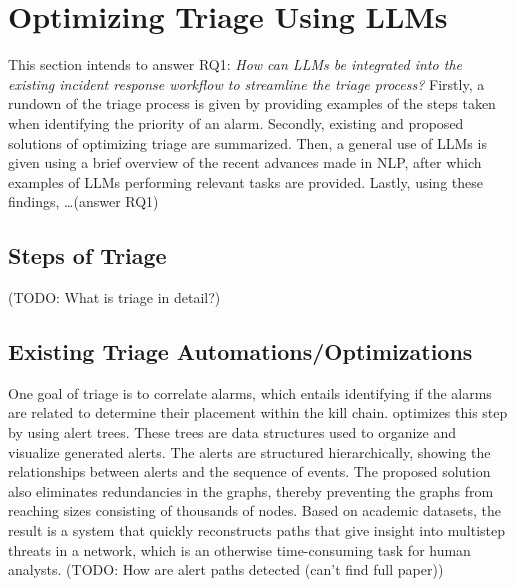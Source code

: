 \section{Optimizing Triage Using LLMs}
\label{sec:rq1}

This section intends to answer RQ1: \textit{How can LLMs be integrated into the existing incident response workflow to
streamline the triage process?}
Firstly, a rundown of the triage process is given by providing examples of the steps taken when identifying the priority
of an alarm.
Secondly, existing and proposed solutions of optimizing triage are summarized.
Then, a general use of LLMs is given using a brief overview of the recent advances made in NLP, after which examples
of LLMs performing relevant tasks are provided.
Lastly, using these findings, \dots (answer RQ1) %

\subsection{Steps of Triage}
\label{subsec:rq1-steps-of-triage}

(TODO: What is triage in detail?) %

\subsection{Existing Triage Automations/Optimizations}
\label{subsec:rq1-existing-optimizations}

One goal of triage is to correlate alarms, which entails identifying if the alarms are related to determine their
placement within the kill chain.
\citet{ficke2022reconstructing} optimizes this step by using alert trees.
These trees are data structures used to organize and visualize generated alerts.
The alerts are structured hierarchically, showing the relationships between alerts and the sequence of events.
The proposed solution also eliminates redundancies in the graphs, thereby preventing the graphs from reaching sizes
consisting of thousands of nodes.
Based on academic datasets, the result is a system that quickly reconstructs paths that give insight into multistep
threats in a network, which is an otherwise time-consuming task for human analysts.
(TODO: How are alert paths detected (can't find full paper)) %

